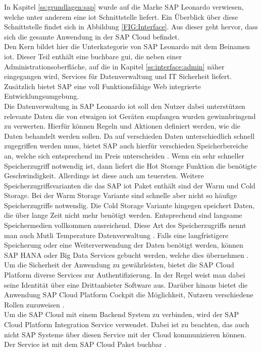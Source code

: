 In Kapitel \ref{ss:grundlagen:sap} wurde auf die Marke SAP Leonardo verwiesen, welche unter anderem eine \ac{iot} Schnittstelle liefert. Ein Überblick über diese Schnittstelle findet sich in Abbildung \ref{FIG:Interface}. Aus dieser geht hervor, dass sich die gesamte Anwendung in der SAP Cloud befindet.\\
\noindent Den Kern bildet hier die Unterkategorie von SAP Leonardo mit dem Beinamen \ac{iot}. Dieser Teil enthält eine buchbare \ac{gui}, die neben einer Administrationsoberfläche, auf die in Kapitel \ref{ss:interface:admin} näher eingegangen wird, Services für Datenverwaltung und IT Sicherheit liefert. Zusätzlich bietet SAP eine voll Funktionsfähige Web integrierte Entwicklungsumgebung.\\
\noindent Die Datenverwaltung in SAP Leonardo \ac{iot} soll den Nutzer dabei unterstützen relevante Daten die von etwaigen \ac{iot} Geräten empfangen wurden gewinnbringend zu verwerten. Hierfür können Regeln und Aktionen definiert werden, wie die Daten behandelt werden sollen. Da auf verschieden Daten unterschiedlich schnell zugegriffen werden muss, bietet SAP auch hierfür verschieden Speicherbereiche an, welche sich entsprechend im Preis unterscheiden \cite[Seite 173]{Holtschulte20:IOS}. Wenn ein sehr schneller Speicherzugriff notwendig ist, dann liefert die Hot Storage Funktion die benötigte Geschwindigkeit. Allerdings ist diese auch am teuersten. Weitere Speicherzugriffsvarianten die das SAP \ac{iot} Paket enthält sind der Warm und Cold Storage. Bei der Warm Storage Variante sind schnelle aber nicht so häufige Speicherzugriffe notwendig. Die Cold Storage Variante hingegen speichert Daten, die über lange Zeit nicht mehr benötigt werden. Entsprechend sind langsame Speichermedien vollkommen ausreichend. Diese Art des Speicherzugriffs nennt man auch Mutli Temperature Datenverwaltung \cite[Seite 118f]{Holtschulte20:IOS}. Falls eine langfristigere Speicherung oder eine Weiterverwendung der Daten benötigt werden, können SAP HANA oder Big Data Services gebucht werden, welche dies übernehmen \cite[Seite 173]{Holtschulte20:IOS}.\\    
\noindent Um die Sicherheit der Anwendung zu gewährleisten, bietet die SAP Cloud Platform diverse Services zur Authentifizierung. In der Regel weist man dabei seine Identität über eine Drittanbieter Software aus. Darüber hinaus bietet die Anwendung SAP Cloud Platform Cockpit die Möglichkeit, Nutzern verschiedene Rollen zuzuweisen \cite[Seite 176ff]{Holtschulte20:IOS}.\\
\noindent Um die SAP Cloud mit einem Backend System zu verbinden, wird der SAP Cloud Platform Integration Service verwendet. Dabei ist zu beachten, das auch nicht SAP Systeme über diesen Service mit der Cloud kommunizieren können. Der Service ist mit dem SAP Cloud Paket buchbar \cite[Seite 146]{Holtschulte20:IOS}.\\
